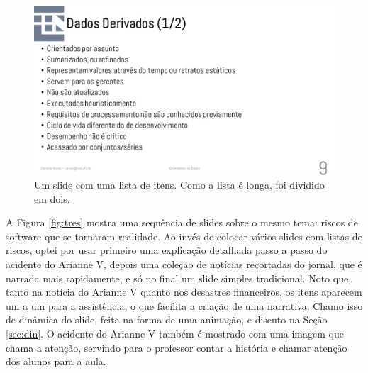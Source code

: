 \begin{figure}[tbh]
    \centering
    \includegraphics[width=\tam\linewidth,frame]{imagens/dados}
    \caption{Um slide com uma lista de itens. Como a lista é longa, foi dividido em dois.}
    \label{fig:dados}
\end{figure}


A Figura \ref{fig:tres} mostra uma sequência de slides sobre o mesmo tema: riscos de software que se tornaram realidade. Ao invés de colocar vários slides com listas de riscos, optei por usar primeiro uma explicação detalhada passo a passo do acidente do Arianne V, depois uma coleção de notícias recortadas do jornal, que é narrada mais rapidamente, e só no final um slide simples tradicional. Noto que, tanto na notícia do Arianne V quanto nos desastres financeiros, os itens aparecem um a um para a assistência, o que facilita a criação de uma narrativa. Chamo isso de dinâmica do slide, feita na forma de uma animação, e discuto na Seção \ref{sec:din}. O acidente do Arianne V também é mostrado com uma imagem que chama a atenção, servindo para o professor contar a história e chamar atenção dos alunos para a aula.

